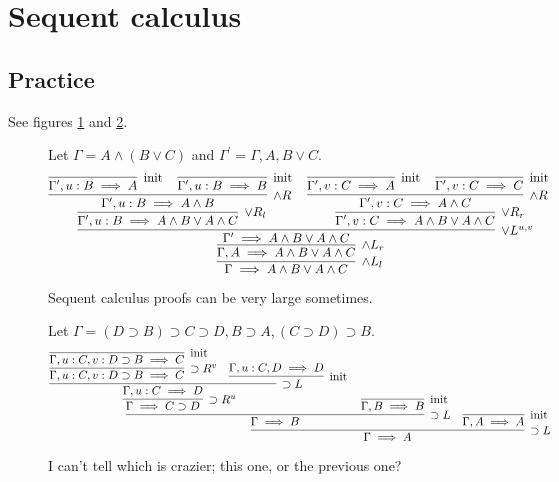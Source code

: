\documentclass[11pt,letterpaper]{article}
\DeclareMathOperator{\opInit}{\mathrm{init}}
\newcommand{\init}{\opInit{}}
\newcommand{\seq}{\implies}
\newcommand{\imp}{\supset}
\begin{document}
\section{Sequent calculus}

\subsection{Practice}

See figures \ref{fig:seq-calc-1} and \ref{fig:seq-calc-2}.

\begin{figure}[ht]
    \centering
    Let $\Gamma = A \land (B \lor C)$ and $\Gamma^\prime = \Gamma, A, B \lor C$.
    \begin{equation*}
        \infer[\land L_l]{\Gamma \seq A \land B \lor A \land C}{
            \infer[\land L_r]{\Gamma, A \seq A \land B \lor A \land C}{
                \infer[\lor L^{u,v}]{\Gamma^\prime \seq A \land B \lor A \land C}{
                    \infer[\lor R_l]{\Gamma^\prime, u:B \seq A \land B \lor A \land C}{
                        \infer[\land R]{\Gamma^\prime, u:B \seq A \land B}{
                            \infer[\init]{\Gamma^\prime, u:B \seq A}{}
                            &
                            \infer[\init]{\Gamma^\prime, u:B \seq B}{}
                        }
                    }
                    &
                    \infer[\lor R_r]{\Gamma^\prime, v:C \seq A \land B \lor A \land C}{
                        \infer[\land R]{\Gamma^\prime, v:C \seq A \land C}{
                            \infer[\init]{\Gamma^\prime, v:C \seq A}{}
                            &
                            \infer[\init]{\Gamma^\prime, v:C \seq C}{}
                        }
                    }
                }
            }
        }
    \end{equation*}
    \caption{
        Sequent calculus proofs can be very large sometimes.
    }
    \label{fig:seq-calc-1}
\end{figure}

\begin{figure}[ht]
    \centering
    Let $\Gamma = (D \imp B) \imp C \imp D, B \imp A, (C \imp D) \imp B$.
    \begin{equation*}
        \infer[\imp L]{\Gamma \seq A}{
            \infer[\imp L]{\Gamma \seq B}{
                \infer[\imp R^u]{\Gamma \seq C \imp D}{
                    \infer[\imp L]{\Gamma, u:C \seq D}{
                        \infer[\imp R^v]{\Gamma, u:C, v:D \imp B \seq C}{
                            \infer[\init]{\Gamma, u:C, v:D \imp B \seq C}{}
                        }
                        &
                        \infer[\init]{}{
                            \Gamma, u:C, D \seq D
                        }
                    }
                }
                &
                \infer[\init]{\Gamma, B \seq B}{}
            }
            &
            \infer[\init]{\Gamma, A \seq A}{}
        }
    \end{equation*}
    \caption{
        I can't tell which is crazier; this one, or the previous one?
    }
    \label{fig:seq-calc-2}
\end{figure}
\end{document}
